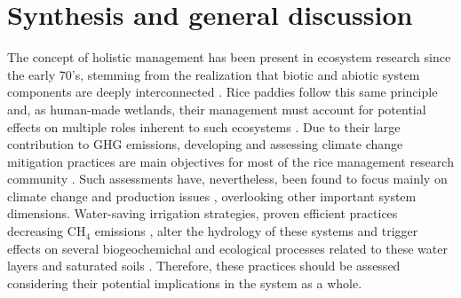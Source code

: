 \chapter*{\Huge Synthesis and general discussion}
\thispagestyle{thesis} %

\renewcommand{\thefigure}{SD.\arabic{figure}}
\setcounter{figure}{0}
\renewcommand{\thetable}{SD.\arabic{table}}
\setcounter{table}{0}


The concept of holistic management has been present in ecosystem research since the early 70's, stemming from the realization that biotic and abiotic system components are deeply interconnected \citep{risser1985toward}. Rice paddies follow this same principle and, as human-made wetlands, their management must account for potential effects on multiple roles inherent to such ecosystems \citep{fasola1996}. Due to their large contribution to GHG emissions, developing and assessing climate change mitigation practices are main objectives for most of the rice management research community \citep{zhang2023}. Such assessments have, nevertheless, been found to focus mainly on climate change and production issues \citep{vuciterna2024}, overlooking other important system dimensions. Water-saving irrigation strategies, proven efficient  practices decreasing CH$_{4}$ emissions \citep{jiang2019}, alter the hydrology of these systems and trigger effects on several biogeochemichal and ecological processes related to these water layers and saturated soils \citep{gharsallah2023}. %
Therefore, these practices should be assessed considering their potential implications in the system as a whole.\\

